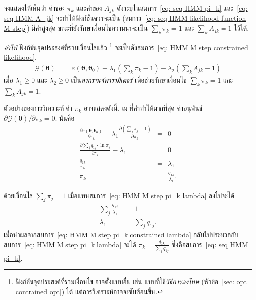 \begin{Exercise}
\label{ex: seq HMM M step derivatives}
	
จงแสดงให้เห็นว่า ค่าของ $\pi_k$
และค่าของ $A_{jk}$
ดังระบุในสมการ~\ref{eq: seq HMM pi_k} และ~\ref{eq: seq HMM A_jk} จะทำให้ฟังก์ชันควรจะเป็น (สมการ~\ref{eq: seq HMM likelihood function M step}) มีค่าสูงสุด ขณะที่ยังรักษาเงื่อนไขความน่าจะเป็น $\sum_k \pi_k = 1$ และ $\sum_k A_{jk} = 1$ ไว้ได้.

\textit{คำใบ้} ฟังก์ชันจุดประสงค์ที่รวมเงื่อนไขแล้ว%
\footnote{%
ฟังก์ชันจุดประสงค์ที่รวมเงื่อนไข อาจตั้งแบบอื่น เช่น แบบที่ใช้\textit{วิธีการลงโทษ} (หัวข้อ~\ref{sec: opt contrained opt}) ได้
แต่การวิเคราะห์อาจจะซับซ้อนขึ้น.
}
จะเป็นดังสมการ~\ref{eq: HMM M step constrained likelihood}.
%
\begin{eqnarray}
\mathcal{G}(\bm{\theta})
&=&
\varepsilon (\bm{\theta}, \bm{\theta}_0) 
- \lambda_1 \left( \sum_k \pi_k - 1 \right)
- \lambda_2 \left( \sum_k A_{jk} - 1 \right)
\label{eq: HMM M step constrained likelihood}
\end{eqnarray}
เมื่อ $\lambda_1 \geq 0$ และ $\lambda_2 \geq 0$ เป็น\textit{ลากรานจ์พารามิเตอร์} เพื่อช่วยรักษาเงื่อนไข
$\sum_k \pi_k = 1$ และ $\sum_k A_{jk} = 1$.

ตัวอย่างของการวิเคราะห์ 
ค่า $\pi_k$ อาจแสดงดังนี้.
ณ ที่ค่าทำให้มากที่สุด ค่าอนุพันธ์ $\partial \mathcal{G}(\bm{\theta})/\partial \pi_k = 0$.
นั่นคือ
\begin{eqnarray}
\frac{\partial \varepsilon (\bm{\theta}, \bm{\theta}_0)}{\partial \pi_k}
- \lambda_1 \frac{\partial \left( \sum_j \pi_j - 1 \right)}{\partial \pi_k}
&=& 0
\nonumber \\
\frac{\partial \sum_j q_{1j} \cdot \ln \pi_j}{\partial \pi_k}
- \lambda_1 
&=& 0
\nonumber \\
\frac{q_{1k}}{\pi_k}
&=& \lambda_1
\nonumber \\
\pi_k
&=& 
\frac{q_{1k}}{\lambda_1}
\label{eq: HMM M step pi_k lambda}.
\end{eqnarray}

ด้วยเงื่อนไข $\sum_j \pi_j = 1$ เมื่อแทนสมการ~\ref{eq: HMM M step pi_k lambda} ลงไปจะได้
\begin{eqnarray}
\sum_j \frac{q_{1j}}{\lambda_1} 
&=& 1
\nonumber \\
\lambda_1 &=& \sum_j q_{1j}
\label{eq: HMM M step pi_k constrained lambda}.
\end{eqnarray}
เมื่อนำผลจากสมการ~\ref{eq: HMM M step pi_k constrained lambda} กลับไปประมวลกับสมการ~\ref{eq: HMM M step pi_k lambda}
จะได้ $\pi_k = \frac{q_{1k}}{\sum_j q_{1j}}$ ซึ่งคือสมการ~\ref{eq: seq HMM pi_k}.

\end{Exercise}

